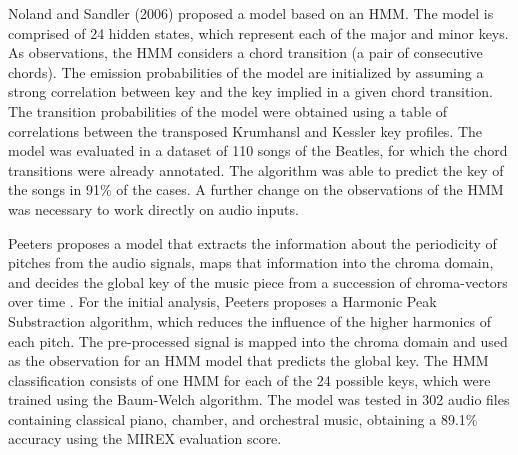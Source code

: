 

Noland and Sandler (2006) proposed a model based on an HMM. The model is comprised of 24 hidden states, which represent each of the major and minor keys. As observations, the HMM considers a chord transition (a pair of consecutive chords). The emission probabilities of the model are initialized by assuming a strong correlation between key and the key implied in a given chord transition. The transition probabilities of the model were obtained using a table of correlations between the transposed Krumhansl and Kessler key profiles. The model was evaluated in a dataset of 110 songs of the Beatles, for which the chord transitions were already annotated. The algorithm was able to predict the key of the songs in 91\% of the cases. A further change on the observations of the HMM was necessary to work directly on audio inputs.


Peeters proposes a model that extracts the information about the periodicity of pitches from the audio signals, maps that information into the chroma domain, and decides the global key of the music piece from a succession of chroma-vectors over time \cite{peeters2006chromabased}. For the initial analysis, Peeters proposes a Harmonic Peak Substraction algorithm, which reduces the influence of the higher harmonics of each pitch. The pre-processed signal is mapped into the chroma domain and used as the observation for an HMM model that predicts the global key. The HMM classification consists of one HMM for each of the 24 possible keys, which were trained using the Baum-Welch algorithm. The model was tested in 302 audio files containing classical piano, chamber, and orchestral music, obtaining a 89.1\% accuracy using the MIREX evaluation score.



